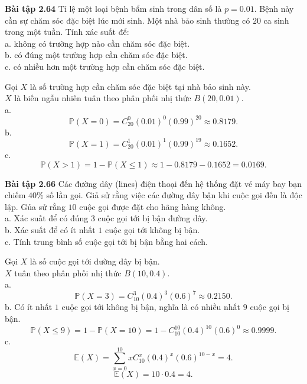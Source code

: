 \documentclass[12pt,a4paper]{article}
\begin{document}
\begin{mybox}
\textbf{Bài tập 2.64} Tỉ lệ một loại bệnh bẩm sinh trong dân số là $p = 0.01.$ Bệnh này cần sự chăm sóc đặc biệt lúc mới sinh. Một nhà bảo sinh thường có $20$ ca sinh trong một tuần. Tính xác suất để:\\
a. không có trường hợp nào cần chăm sóc đặc biệt.\\
b. có đúng một trường hợp cần chăm sóc đặc biệt.\\
c. có nhiều hơn một trường hợp cần chăm sóc đặc biệt.
\end{mybox}
Gọi $X$ là số trường hợp cần chăm sóc đặc biệt tại nhà bảo sinh này.\\
$X$ là biến ngẫu nhiên tuân theo phân phối nhị thức $B \left( {20, 0.01} \right).$\\
a. $$\mathbb{P} \left( {X = 0} \right) = C^0_{20} \left( {0.01} \right)^{0} \left( {0.99} \right)^{20} \approx 0.8179.$$
b. $$\mathbb{P} \left( {X = 1} \right) = C^1_{20} \left( {0.01} \right)^{1} \left( {0.99} \right)^{19} \approx 0.1652.$$
c. $$\mathbb{P} \left( {X > 1} \right) = 1 - \mathbb{P} \left( {X \leqslant 1} \right) \approx 1 - 0.8179 - 0.1652 = 0.0169.$$

\begin{mybox}
\textbf{Bài tập 2.66} Các đường dây (lines) điện thoại đến hệ thống đặt vé máy bay bạn chiếm $40 \%$ số lần gọi. Giả sử rằng việc các đường dây bận khi cuộc gọi đến là độc lập. Gủa sử rằng $10$ cuộc gọi được đặt cho hãng hàng không.\\
a. Xác suất để có đúng $3$ cuộc gọi tới bị bận đường dây.\\
b. Xác suất để có ít nhất $1$ cuộc gọi tới không bị bận.\\
c. Tính trung bình số cuộc gọi tới bị bận bằng hai cách.
\end{mybox}
Gọi $X$ là số cuộc gọi tới đường dây bị bận.\\
$X$ tuân theo phân phối nhị thức $B \left( {10, 0.4} \right).$\\
a. $$\mathbb{P} \left( {X = 3} \right) = C^3_{10} \left( {0.4} \right)^3 \left( {0.6} \right)^7 \approx 0.2150.$$
b. Có ít nhất $1$ cuộc gọi tới không bị bận, nghĩa là có nhiều nhất $9$ cuộc gọi bị bận.
$$\mathbb{P} \left( {X \leqslant 9} \right) = 1 - \mathbb{P} \left( {X = 10} \right) = 1 - C^{10}_{10} \left( {0.4} \right)^{10} \left( {0.6} \right)^0 \approx 0.9999.$$
c. $$\mathbb{E} \left( X \right) = \sum\limits_{x = 0}^{10} {xC_{10}^x{{\left( {0.4} \right)}^x}{{\left( {0.6} \right)}^{10 - x}}}  = 4.$$
$$\mathbb{E} \left( X \right) = 10 \cdot 0.4 = 4.$$
\end{document}

